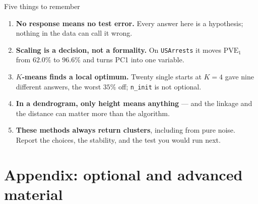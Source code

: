\documentclass[aspectratio=169,11pt]{beamer}
\begin{document}
\begin{frame}{Five things to remember}
  \begin{takeaway}
    \begin{enumerate}
      \item \textbf{No response means no test error.} Every answer here is a hypothesis;
            nothing in the data can call it wrong.
      \item \textbf{Scaling is a decision, not a formality.} On \texttt{USArrests} it moves
            $\mathrm{PVE}_1$ from $62.0\%$ to $96.6\%$ and turns PC1 into one variable.
      \item \textbf{$K$-means finds a local optimum.} Twenty single starts at $K=4$ gave
            nine different answers, the worst $35\%$ off; \texttt{n\_init} is not optional.
      \item \textbf{In a dendrogram, only height means anything} --- and the linkage and the
            distance can matter more than the algorithm.
      \item \textbf{These methods always return clusters}, including from pure noise. Report
            the choices, the stability, and the test you would run next.
    \end{enumerate}
  \end{takeaway}
\end{frame}

\appendix
\AtBeginSection[]{}
\section{Appendix: optional and advanced material}
\end{document}
